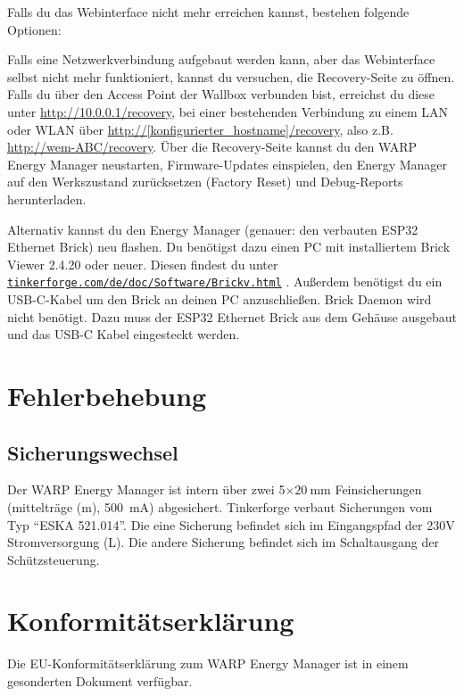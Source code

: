 \documentclass[a4paper,10pt]{article}
\newcommand\rurl[2]{%
  \href{#1}{\nolinkurl{#2}}%
}
\begin{document}
\begin{multicols*}{2}
	Falls du das Webinterface nicht mehr erreichen kannst, bestehen folgende Optionen:

	Falls eine Netzwerkverbindung aufgebaut werden kann, aber das Webinterface selbst nicht mehr funktioniert, kannst du versuchen, die Recovery-Seite zu öffnen.
	Falls du über den Access Point der Wallbox verbunden bist, erreichst du diese unter \url{http://10.0.0.1/recovery},
	bei einer bestehenden Verbindung zu einem LAN oder WLAN über
	\url{http://[konfigurierter_hostname]/recovery}, also z.B. \url{http://wem-ABC/recovery}.
	Über die Recovery-Seite kannst du den WARP Energy Manager neustarten, Firmware-Updates einspielen,
	den Energy Manager auf den Werkszustand zurücksetzen (Factory Reset) und Debug-Reports
	herunterladen.

	Alternativ kannst du den Energy Manager (genauer: den verbauten ESP32 Ethernet
	Brick) neu flashen.
	Du benötigst dazu einen PC mit installiertem Brick Viewer 2.4.20 oder neuer. Diesen findest du unter
	 \rurl{https://www.tinkerforge.com/de/doc/Software/Brickv.html}{tinkerforge.com/de/doc/Software/Brickv.html}.
	Außerdem benötigst du ein USB-C-Kabel um den Brick an deinen PC anzuschließen. Brick Daemon wird nicht benötigt.
	Dazu muss der ESP32 Ethernet Brick aus dem Gehäuse ausgebaut und das USB-C
	Kabel eingesteckt werden.



	\newpage
	\section{Fehlerbehebung}

	\subsection{Sicherungswechsel}
	Der WARP Energy Manager ist intern über zwei 5$\times\SI{20}{\milli\meter}$ Feinsicherungen (mittelträge (m), \SI{500}{\milli\ampere}) abgesichert.
	Tinkerforge verbaut Sicherungen vom Typ \enquote{ESKA 521.014}. Die eine
	Sicherung befindet sich im Eingangspfad der 230V Stromversorgung (L). Die
	andere Sicherung befindet sich im Schaltausgang der Schützsteuerung.



	\section{Konformitätserklärung}
	Die EU-Konformitätserklärung zum WARP Energy Manager ist in einem gesonderten Dokument verfügbar.


\end{multicols*}
\end{document}
